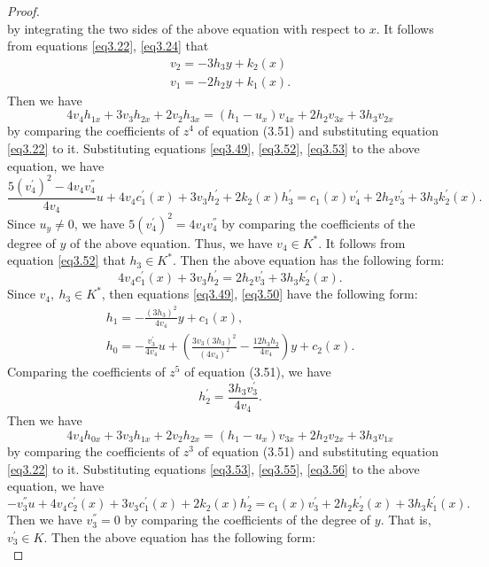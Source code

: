 \documentclass[12pt, twoside, leqno]{article}
\theoremstyle{definition}
\numberwithin{equation}{section}
\begin{document}
\begin{proof}
\begin{equation}
\end{equation}
by integrating the two sides of the above equation with respect to $x$. It follows from equations \eqref{eq3.22}, \eqref{eq3.24} that
\begin{eqnarray}\label{eq3.53}
v_2=-3h_3y+k_2(x)\\\nonumber
v_{1}=-2h_{2}y+k_{1}(x).
\end{eqnarray}
Then we have
$$4v_4h_{1x}+3v_3h_{2x}+2v_2h_{3x}=(h_1-u_x)v_{4x}+2h_2v_{3x}+3h_3v_{2x}$$
by comparing the coefficients of $z^4$ of equation (3.51) and substituting equation \eqref{eq3.22} to it. Substituting equations \eqref{eq3.49}, \eqref{eq3.52}, \eqref{eq3.53} to the above equation, we have
$$\frac{5(v_{4}^{'})^2-4v_{4}v_{4}^{''}}{4v_{4}}u+4v_{4}c_{1}^{'}(x)+3v_3h_{2}^{'}+2k_{2}(x)h_{3}^{'}=c_{1}(x)v_{4}^{'}+2h_{2}v_{3}^{'}+3h_{3}k_{2}^{'}(x).$$
Since $u_y\neq 0$, we have $5(v_{4}^{'})^2=4v_{4}v_{4}^{''}$ by comparing the coefficients of the degree of $y$ of the above equation. Thus, we have $v_4\in K^*$. It follows from equation \eqref{eq3.52} that $h_3\in K^*$. Then the above equation has the following form:
\begin{equation}\label{eq3.54}
4v_{4}c_{1}^{'}(x)+3v_3h_{2}^{'}=2h_{2}v_{3}^{'}+3h_{3}k_{2}^{'}(x).
\end{equation}
Since $v_4,~h_3\in K^*$, then equations \eqref{eq3.49}, \eqref{eq3.50} have the following form:
\begin{eqnarray}
h_1=-\frac{(3h_3)^2}{4v_4}y+c_1(x),\label{eq3.55}\\
h_{0}=-\frac{v_3^{'}}{4v_{4}}u+\left(\frac{3v_3(3h_{3})^{2}}{(4v_{4})^{2}}-\frac{12h_{3}h_{2}}{4v_{4}}\right)y +c_2(x).\label{eq3.56}
\end{eqnarray}
Comparing the coefficients of $z^5$ of equation (3.51), we have
\begin{equation}\label{eq3.57}
h_{2}^{'}=\frac{3h_{3}v_{3}^{'}}{4v_{4}}.
\end{equation}
Then we have
$$4v_4h_{0x}+3v_3h_{1x}+2v_2h_{2x}=(h_1-u_x)v_{3x}+2h_2v_{2x}+3h_3v_{1x}$$
by comparing the coefficients of $z^3$ of equation (3.51) and substituting equation \eqref{eq3.22} to it. Substituting equations \eqref{eq3.53}, \eqref{eq3.55}, \eqref{eq3.56} to the above equation, we have
$$-v_{3}^{''}u+4v_{4}c_{2}^{'}(x)+3v_3c_{1}^{'}(x)+2k_{2}(x)h_{2}^{'}=c_{1}(x)v_{3}^{'}+2h_{2}k_{2}^{'}(x)+3h_{3}k_{1}^{'}(x).$$
Then we have $v_{3}^{''}=0$ by comparing the coefficients of the degree of $y$. That is, $v_{3}^{'}\in K$. Then the above equation has the following form:
\begin{equation}\label{eq3.58}

\end{equation}
\end{proof}
\end{document}
